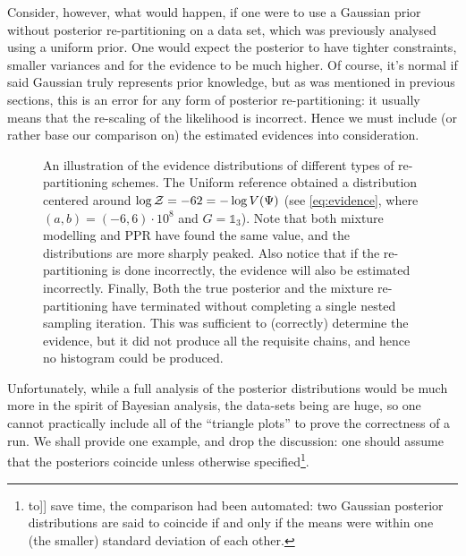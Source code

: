 \documentclass[usenatbib]{mnras}
\begin{document}
Consider, however, what would happen, if one were to use a Gaussian
prior without posterior re-partitioning on a data set, which was
previously analysed using a uniform prior. One would expect the
posterior to have tighter constraints, smaller variances and for
the evidence to be much higher. Of course, it's normal if said
Gaussian truly represents prior knowledge, but as was mentioned in
previous sections, this is an error for any form of posterior
re-partitioning: it usually means that the re-scaling of the
likelihood is incorrect. Hence we must include (or rather base our
comparison on) the estimated evidences into consideration.

\begin{figure}

\caption{\label{orgfba0b30}
An illustration of the evidence distributions of different types of re-partitioning schemes. The Uniform reference obtained a distribution centered around \(\log {\cal Z} = -62 = - \log V(\Psi)\) (see \autoref{eq:evidence}, where \((a,b)=(-6, 6)\cdot 10^{8}\) and \(G=\mathds{1}_{3}\)). Note that both mixture modelling and PPR have found the same value, and the distributions are more sharply peaked. Also notice that if the re-partitioning is done incorrectly, the evidence will also be estimated incorrectly. Finally, Both the true posterior and the mixture re-partitioning have terminated without completing a single nested sampling iteration. This was sufficient to (correctly) determine the evidence, but it did not produce all the requisite chains, and hence no histogram could be produced.}
\end{figure}

Unfortunately, while a full analysis of the posterior distributions
would be much more in the spirit of Bayesian analysis, the data-sets
being are huge, so one cannot practically include all of
the ``triangle plots'' to prove the correctness of a run. We shall
provide one example, and drop the discussion: one should assume
that the posteriors coincide unless otherwise specified\footnote{to]] save time, the comparison had been automated: two Gaussian
posterior distributions are said to coincide if and only if the means
were within one (the smaller) standard deviation  of each
other.}. 
\end{document}
